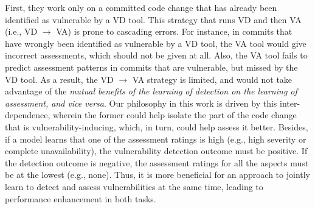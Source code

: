 First, they work only on a committed code change that has already been identified as vulnerable by a VD tool.
This strategy that runs VD and then VA (i.e., VD $\rightarrow$ VA)
is prone to cascading errors.
For instance, in commits that have wrongly been identified as vulnerable by a VD tool, 
the VA tool would give incorrect assessments, which should not be
given at all. 
Also, the VA tool fails to predict assessment patterns in commits that are vulnerable, but missed by the VD tool.
As a result, the VD $\rightarrow$ VA strategy is limited, and would not
take advantage of the {\em mutual benefits of the learning of detection
  on the learning of assessment, and vice versa}. 
Our philosophy in this work is driven by this inter-dependence, wherein the former could help isolate the part of the code change that is vulnerability-inducing, which, in turn, could help assess it better.
Besides, if a model learns that one of the
assessment ratings is high (e.g., high severity or complete
unavailability), the vulnerability detection outcome must be
positive. If the detection outcome is negative, the assessment ratings
for all the aspects must be at the lowest (e.g., none). Thus, it is
more beneficial for an approach to jointly learn to detect and assess vulnerabilities at the same time, leading to performance enhancement in both tasks.

